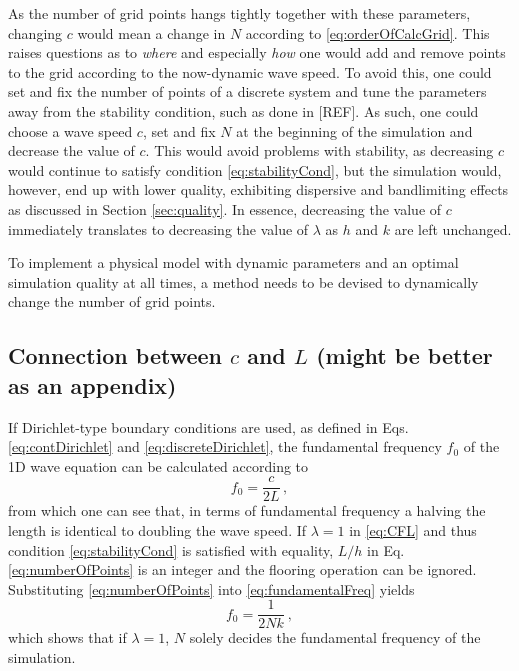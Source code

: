 \documentclass[dvipsnames, reprint]{JASA}
\def\SWcomment[#1]{\textcolor{Bittersweet}{#1}}
\begin{document}
As the number of grid points hangs tightly together with these parameters, changing $c$ would mean a change in $N$ according to \eqref{eq:orderOfCalcGrid}. This raises questions as to \textit{where} and especially \textit{how} one would add and remove points to the grid according to the now-dynamic wave speed. To avoid this, one could set and fix the number of points of a discrete system and tune the parameters away from the stability condition, such as done in [REF]. As such, one could choose a wave speed $c$, set and fix $N$ at the beginning of the simulation and decrease the value of $c$. This would avoid problems with stability, as decreasing $c$ would continue to satisfy condition \eqref{eq:stabilityCond}, but the simulation would, however, end up with lower quality, exhibiting dispersive and bandlimiting effects as discussed in Section \ref{sec:quality}. In essence, decreasing the value of $c$ immediately translates to decreasing the value of $\lambda$ as $h$ and $k$ are left unchanged.

To implement a physical model with dynamic parameters and an optimal simulation quality at all times, a method needs to be devised to dynamically change the number of grid points.



\subsection{Connection between $c$ and $L$ \SWcomment[(might be better as an appendix)]}\label{sec:f0}
If Dirichlet-type boundary conditions are used, as defined in Eqs. \eqref{eq:contDirichlet} and \eqref{eq:discreteDirichlet}, the fundamental frequency $f_0$ of the 1D wave equation can be calculated according to
\begin{equation}\label{eq:fundamentalFreq}
    f_0 = \frac{c}{2L}\,,
\end{equation}
from which one can see that, in terms of fundamental frequency a halving the length is identical to doubling the wave speed. 
If $\lambda = 1$ in \eqref{eq:CFL} and thus condition \eqref{eq:stabilityCond} is satisfied with equality, $L/h$ in Eq. \eqref{eq:numberOfPoints} is an integer and the flooring operation can be ignored. Substituting \eqref{eq:numberOfPoints} into \eqref{eq:fundamentalFreq} yields
\begin{equation}
    f_0 = \frac{1}{2Nk}\ ,
\end{equation}
which shows that if $\lambda = 1$, $N$ solely decides the fundamental frequency of the simulation.
\end{document}
